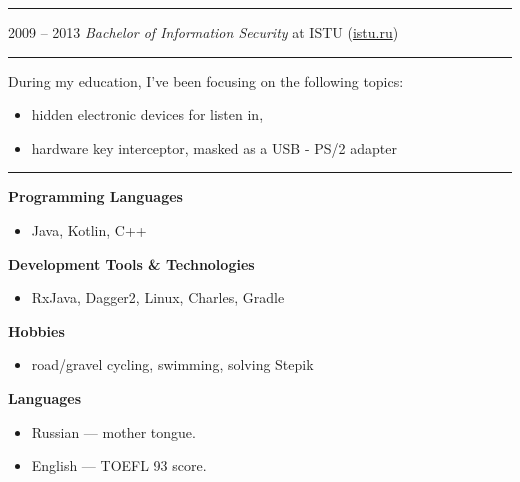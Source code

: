 \documentclass[11pt]{article}
\newcommand\CvSmallSkipLength{0.5em}
\newcommand\CvBigSkipLength{1em}
\newcommand\CvSkip[1]{\vspace{#1}}
\newcommand\CvSmallSkip{\CvSkip{\CvSmallSkipLength}}
\newcommand\CvBigSkip{\CvSkip{\CvBigSkipLength}}
\newcommand\CvSectionHeader[1]{\CvBigSkip\textbf{#1}\CvBigSkip}
\newcommand\CvRule{\begingroup\color{CvRuleColor}\hrule\endgroup}
\newcommand\CvWorkplaceHeader[5]{\begingroup%
	\CvRule%
	\fboxsep0pt%
	\colorbox{CvWorkplaceHeaderColor}{%
		\begin{minipage}{\linewidth-2\fboxsep}%
			\CvSmallSkip%
			#1 -- #2 \hfill \textit{#3} at #4 (\href{http://#5/}{#5})%
			\CvSmallSkip%
		\end{minipage}%
	}%
	\CvRule%
	\endgroup%
}
\newenvironment{CvWorkplaceDescription}{%
	\begingroup\setlength\parskip{\CvSmallSkipLength}%
}{%
	\CvSmallSkip\endgroup%
}
\begin{document}
	
	\CvWorkplaceHeader{2009}{2013}{Bachelor of Information Security}{ISTU}{istu.ru}
	
	\begin{CvWorkplaceDescription}
		During my education, I've been focusing on the following topics:
		\begin{itemize}[noitemsep]
			\item hidden electronic devices for listen in,
			\item hardware key interceptor, masked as a USB - PS/2 adapter
		\end{itemize}
	\end{CvWorkplaceDescription}
	\CvRule
	
	\begin{minipage}[t]{.5\linewidth}
		\CvSectionHeader{Programming Languages}
		
		\begin{itemize}
			\item Java, Kotlin, C++
		\end{itemize}
		
		\CvSectionHeader{Development Tools \& Technologies}
		
		\begin{itemize}
			\item RxJava, Dagger2, Linux, Charles, Gradle
		\end{itemize}
		
		\CvSectionHeader{Hobbies}
		
		\begin{itemize}
			\item road/gravel cycling, swimming, solving Stepik
		\end{itemize}
	\end{minipage}
	\begin{minipage}[t]{.5\linewidth}
		\CvSectionHeader{Languages}
		
		\begin{itemize}
			\item Russian --- mother tongue.
			\item English --- TOEFL 93 score.
		\end{itemize}
		
		
	\end{minipage}
	
\end{document}
